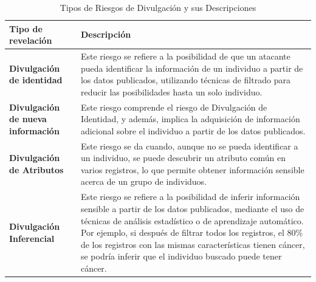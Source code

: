 \begin{table}[H]
	\centering
	\caption{Tipos de Riesgos de Divulgación y sus Descripciones}
	\label{relevantes-definiciones}
    \begin{tabular}{|m{15em}|m{20em}|}
    \hline
    \rowcolor[gray]{0.8}
    Tipo de revelación & Descripción \\
    \hline
    \textbf{Divulgación de identidad} 
    & Este riesgo se refiere a la posibilidad de que un atacante pueda identificar la información de un individuo a partir de los datos publicados, utilizando técnicas de filtrado para reducir las posibilidades hasta un solo individuo.\\
    \hline
    \textbf{Divulgación de nueva información} 
    & Este riesgo comprende el riesgo de Divulgación de Identidad, y además, implica la adquisición de información adicional sobre el individuo a partir de los datos publicados.\\
    \hline
    \textbf{Divulgación de Atributos} 
    & Este riesgo se da cuando, aunque no se pueda identificar a un individuo, se puede descubrir un atributo común en varios registros, lo que permite obtener información sensible acerca de un grupo de individuos.\\
    \hline
    \textbf{Divulgación Inferencial} 
    & Este riesgo se refiere a la posibilidad de inferir información sensible a partir de los datos publicados, mediante el uso de técnicas de análisis estadístico o de aprendizaje automático. Por ejemplo, si después de filtrar todos los registros, el 80\% de los registros con las mismas características tienen cáncer, se podría inferir que el individuo buscado puede tener cáncer.\\
    \hline
    \end{tabular}
\end{table}


